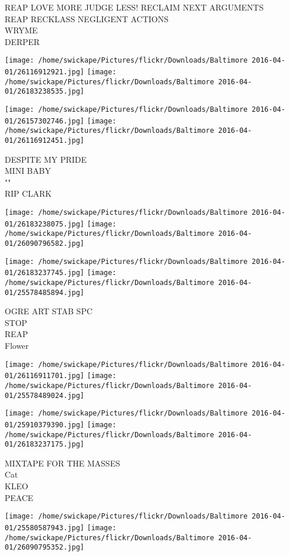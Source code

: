 \documentclass[10pt,letterpaper]{article}
\begin{document}
REAP LOVE MORE JUDGE LESS! RECLAIM NEXT ARGUMENTS\\
REAP RECKLASS NEGLIGENT ACTIONS\\
WRYME\\
DERPER
\pagebreak

\texttt{[image: /home/swickape/Pictures/flickr/Downloads/Baltimore 2016-04-01/26116912921.jpg]}
\texttt{[image: /home/swickape/Pictures/flickr/Downloads/Baltimore 2016-04-01/26183238535.jpg]}

\texttt{[image: /home/swickape/Pictures/flickr/Downloads/Baltimore 2016-04-01/26157302746.jpg]}
\texttt{[image: /home/swickape/Pictures/flickr/Downloads/Baltimore 2016-04-01/26116912451.jpg]}

DESPITE MY PRIDE\\
MINI BABY\\
""\\
RIP CLARK
\pagebreak

\texttt{[image: /home/swickape/Pictures/flickr/Downloads/Baltimore 2016-04-01/26183238075.jpg]}
\texttt{[image: /home/swickape/Pictures/flickr/Downloads/Baltimore 2016-04-01/26090796582.jpg]}

\texttt{[image: /home/swickape/Pictures/flickr/Downloads/Baltimore 2016-04-01/26183237745.jpg]}
\texttt{[image: /home/swickape/Pictures/flickr/Downloads/Baltimore 2016-04-01/25578485894.jpg]}

OGRE ART STAB SPC\\
STOP\\
REAP\\
Flower
\pagebreak

\texttt{[image: /home/swickape/Pictures/flickr/Downloads/Baltimore 2016-04-01/26116911701.jpg]}
\texttt{[image: /home/swickape/Pictures/flickr/Downloads/Baltimore 2016-04-01/25578489024.jpg]}

\texttt{[image: /home/swickape/Pictures/flickr/Downloads/Baltimore 2016-04-01/25910379390.jpg]}
\texttt{[image: /home/swickape/Pictures/flickr/Downloads/Baltimore 2016-04-01/26183237175.jpg]}

MIXTAPE FOR THE MASSES\\
Cat\\
KLEO\\
PEACE
\pagebreak

\texttt{[image: /home/swickape/Pictures/flickr/Downloads/Baltimore 2016-04-01/25580587943.jpg]}
\texttt{[image: /home/swickape/Pictures/flickr/Downloads/Baltimore 2016-04-01/26090795352.jpg]}
\end{document}
